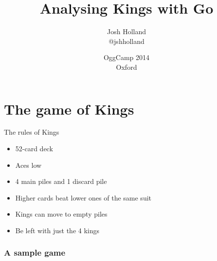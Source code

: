 \documentclass{beamer}
\title{Analysing Kings with Go}
\author[@jshholland]{Josh Holland \\ @jshholland}
\date[OggCamp 2014]{OggCamp 2014 \\ Oxford}
\begin{document}
\frame{\titlepage}

\frame{\tableofcontents}

\section{The game of Kings}

\begin{frame}{The rules of Kings}
\begin{itemize}
  \item 52-card deck
  \item Aces low
  \item 4 main piles and 1 discard pile
  \item Higher cards beat lower ones of the same suit
  \item Kings can move to empty piles
  \pause
  \item \alert{Be left with just the 4 kings}
\end{itemize}
\end{frame}

\begin{frame}[fragile]
\frametitle{A sample game}







\end{frame}
\end{document}
